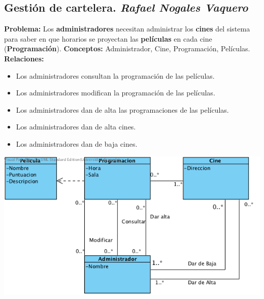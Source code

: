 \documentclass{article}
\begin{document}
	\subsection*{Gestión de cartelera. \textit{Rafael Nogales Vaquero}}
	\textbf{Problema:} Los \textbf{administradores} necesitan administrar los \textbf{cines} del sistema para saber en que horarios se proyectan 
	las \textbf{películas} en cada cine (\textbf{Programación}).
	\textbf{Conceptos:} Administrador, Cine, Programación, Películas.\\
	\textbf{	Relaciones:}
		\begin{itemize}
			\item Los administradores consultan la programación de las películas.
			\item Los administradores modifican la programación de las películas.
			\item Los administradores dan de alta las programaciones de las películas.
			\item Los administradores dan de alta cines.
			\item Los administradores dan de baja cines.
		\end{itemize}
	\includegraphics[width=1\linewidth]{./C-Cartelera}
		
\end{document}
